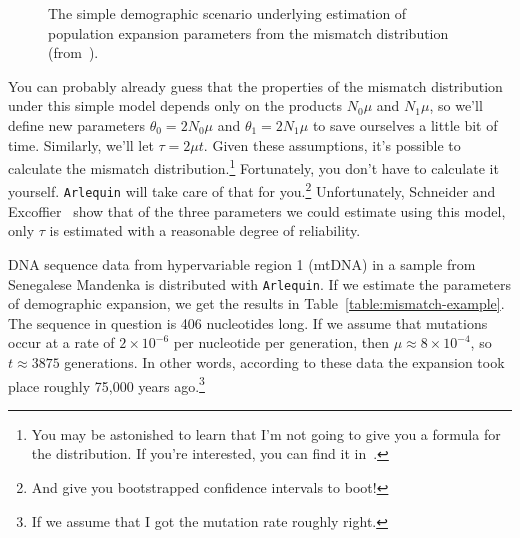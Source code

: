 \documentclass[12pt]{article}
\begin{document}
\begin{figure}
\begin{center}
\end{center}
\caption{The simple demographic scenario underlying estimation of
  population expansion parameters from the mismatch distribution
  (from~\cite{Schneider-Excoffier-1999}).}\label{fig:mismatch-model}
\end{figure}

You can probably already guess that the properties of the mismatch
distribution under this simple model depends only on the products
$N_0\mu$ and $N_1\mu$, so we'll define new parameters
$\theta_0=2N_0\mu$ and $\theta_1=2N_1\mu$ to save ourselves a little
bit of time. Similarly, we'll let $\tau = 2\mu t$. Given these
assumptions, it's possible to calculate the mismatch
distribution.\footnote{You may be astonished to learn that I'm not
  going to give you a formula for the distribution. If you're
  interested, you can find it in~\cite{Schneider-Excoffier-1999}.}
Fortunately, you don't have to calculate it yourself. {\tt Arlequin}
will take care of that for you.\footnote{And give you bootstrapped
  confidence intervals to boot!} Unfortunately, Schneider and
Excoffier~\cite{Schneider-Excoffier-1999} show that of the three
parameters we could estimate using this model, only $\tau$ is
estimated with a reasonable degree of reliability.

DNA sequence data from hypervariable region 1 (mtDNA) in a sample from
Senegalese Mandenka is distributed with {\tt Arlequin}. If we estimate
the parameters of demographic expansion, we get the results in
Table~\ref{table:mismatch-example}. The sequence in question is 406
nucleotides long. If we assume that mutations occur at a rate of
$2\times 10^{-6}$ per nucleotide per generation, then $\mu \approx
8\times 10^{-4}$, so $t \approx 3875$ generations. In other words,
according to these data the expansion took place roughly 75,000 years
ago.\footnote{If we assume that I got the mutation rate roughly
  right.}
\end{document}
